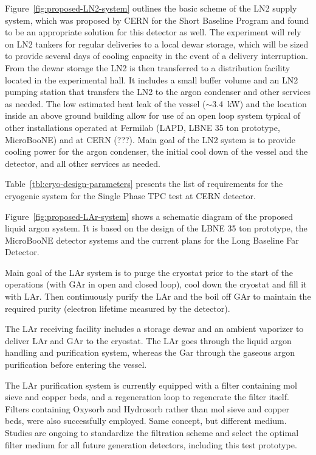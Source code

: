 Figure~\ref{fig:proposed-LN2-system} outlines the basic scheme of the LN2 supply system, which was 
proposed by CERN for the Short Baseline Program and found to be an appropriate solution for this 
detector as well. The experiment will rely on LN2 tankers for regular deliveries to a local dewar storage, 
which will be sized to provide several days of cooling capacity in the event of a delivery interruption. 
From the dewar storage the LN2 is then transferred to a distribution facility located in the experimental 
hall. It includes a small buffer volume and an LN2 pumping station that transfers the LN2 to the argon 
condenser and other services as needed. The low estimated heat leak of the vessel ($\sim$3.4~kW) and the 
location inside an above ground building allow for use of an open loop system typical of other 
installations operated at Fermilab (LAPD, LBNE 35 ton prototype, MicroBooNE) and at CERN (???). 
Main goal of the LN2 system is to provide cooling power for the argon condenser, the initial cool down of 
the vessel and the detector, and all other services as needed.

 Table~\ref{tbl:cryo-design-parameters} presents the list of 
requirements for the cryogenic system for the Single Phase TPC test at CERN detector.

Figure~\ref{fig:proposed-LAr-system} shows a schematic diagram of the proposed liquid argon system. It is based on the design of the 
LBNE 35 ton prototype, the MicroBooNE detector systems and the current plans for the Long Baseline Far 
Detector.

Main goal of the LAr system is to purge the cryostat prior to the start of the operations (with GAr in open 
and closed loop), cool down the cryostat and fill it with LAr. Then continuously purify the LAr and the boil 
off GAr to maintain the required purity (electron lifetime measured by the detector).

The LAr receiving facility includes a storage dewar and an ambient vaporizer to deliver LAr and GAr to the 
cryostat. The LAr goes through the liquid argon handling and purification system, whereas the Gar 
through the gaseous argon purification before entering the vessel.

The LAr purification system is currently equipped with a filter containing mol sieve and copper beds, and 
a regeneration loop to regenerate the filter itself. Filters containing Oxysorb and Hydrosorb rather than 
mol sieve and copper beds, were also successfully employed. Same concept, but different medium. 
Studies are ongoing to standardize the filtration scheme and select the optimal filter medium for all 
future generation detectors, including this test prototype. 

